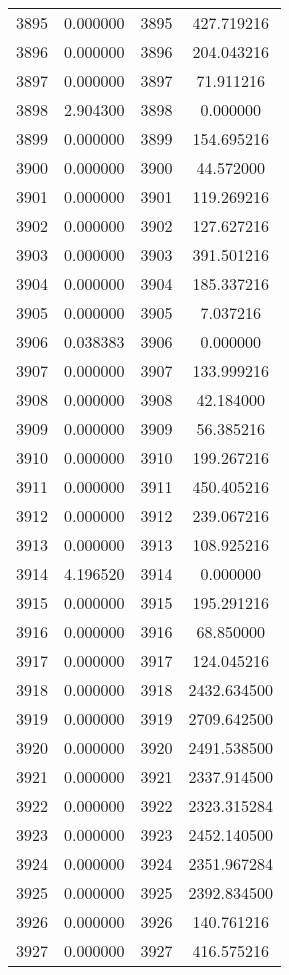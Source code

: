 \documentclass[12pt]{article}
\begin{document}
\begin{longtable}{@{}cccc@{}}
3895 & 0.000000 & 3895 & 427.719216 \\
3896 & 0.000000 & 3896 & 204.043216 \\
3897 & 0.000000 & 3897 & 71.911216 \\
3898 & 2.904300 & 3898 & 0.000000 \\
3899 & 0.000000 & 3899 & 154.695216 \\
3900 & 0.000000 & 3900 & 44.572000 \\
3901 & 0.000000 & 3901 & 119.269216 \\
3902 & 0.000000 & 3902 & 127.627216 \\
3903 & 0.000000 & 3903 & 391.501216 \\
3904 & 0.000000 & 3904 & 185.337216 \\
3905 & 0.000000 & 3905 & 7.037216 \\
3906 & 0.038383 & 3906 & 0.000000 \\
3907 & 0.000000 & 3907 & 133.999216 \\
3908 & 0.000000 & 3908 & 42.184000 \\
3909 & 0.000000 & 3909 & 56.385216 \\
3910 & 0.000000 & 3910 & 199.267216 \\
3911 & 0.000000 & 3911 & 450.405216 \\
3912 & 0.000000 & 3912 & 239.067216 \\
3913 & 0.000000 & 3913 & 108.925216 \\
3914 & 4.196520 & 3914 & 0.000000 \\
3915 & 0.000000 & 3915 & 195.291216 \\
3916 & 0.000000 & 3916 & 68.850000 \\
3917 & 0.000000 & 3917 & 124.045216 \\
3918 & 0.000000 & 3918 & 2432.634500 \\
3919 & 0.000000 & 3919 & 2709.642500 \\
3920 & 0.000000 & 3920 & 2491.538500 \\
3921 & 0.000000 & 3921 & 2337.914500 \\
3922 & 0.000000 & 3922 & 2323.315284 \\
3923 & 0.000000 & 3923 & 2452.140500 \\
3924 & 0.000000 & 3924 & 2351.967284 \\
3925 & 0.000000 & 3925 & 2392.834500 \\
3926 & 0.000000 & 3926 & 140.761216 \\
3927 & 0.000000 & 3927 & 416.575216 \\

\end{longtable}
\end{document}
